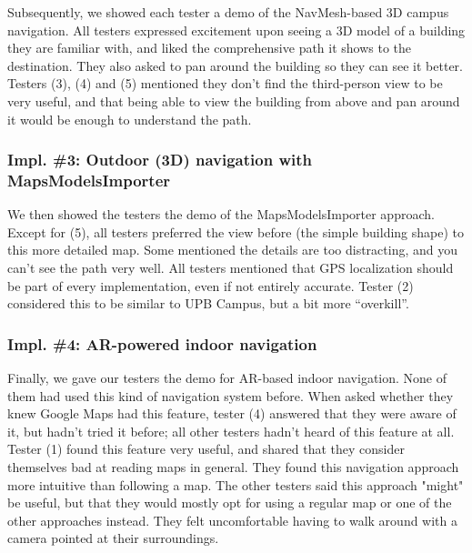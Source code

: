             Subsequently, we showed each tester a demo of the NavMesh-based 3D campus navigation. All testers expressed excitement upon seeing a 3D model of a building they are familiar with, and liked the comprehensive path it shows to the destination. They also asked to pan around the building so they can see it better. Testers (3), (4) and (5) mentioned they don’t find the third-person view to be very useful, and that being able to view the building from above and pan around it would be enough to understand the path.

        \subsubsection{Impl. \#3: Outdoor (3D) navigation with MapsModelsImporter}
        
            We then showed the testers the demo of the MapsModelsImporter approach. Except for (5), all testers preferred the view before (the simple building shape) to this more detailed map. Some mentioned the details are too distracting, and you can’t see the path very well. All testers mentioned that GPS localization should be part of every implementation, even if not entirely accurate. Tester (2) considered this to be similar to UPB Campus, but a bit more “overkill”.
        
        \subsubsection{Impl. \#4: AR-powered indoor navigation}
        
            Finally, we gave our testers the demo for AR-based indoor navigation. None of them had used this kind of navigation system before. When asked whether they knew Google Maps had this feature, tester (4) answered that they were aware of it, but hadn't tried it before; all other testers hadn't heard of this feature at all.
            Tester (1) found this feature very useful, and shared that they consider themselves bad at reading maps in general. They found this navigation approach more intuitive than following a map. The other testers said this approach "might" be useful, but that they would mostly opt for using a regular map or one of the other approaches instead. They felt uncomfortable having to walk around with a camera pointed at their surroundings.
